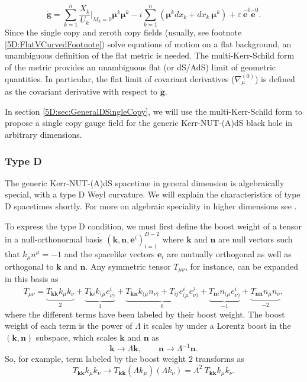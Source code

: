 %
\begin{equation} 
    \mathring{\mathbf{g}} = \sum_{k = 1}^{n} \frac{X_{k}}{U_{k}} \bigg\vert_{M_{k} = 0} \boldsymbol{\mu}^{k}
    \boldsymbol{\mu}^{k} - i \sum_{k = 1}^{n} \left(\boldsymbol{\mu}^{k} dx_{k} + dx_{k}\
    \boldsymbol{\mu}^{k}\right) +
    \varepsilon\ \mathbf{\hat{e}}^{0} \mathbf{\hat{e}}^{0}.
\end{equation}
%
Since the single copy and zeroth copy fields (usually, see footnote \ref{5D:FlatVCurvedFootnote}) solve equations of motion on
a flat background, an unambiguous definition of the flat metric is needed. The multi-Kerr-Schild form of the metric
provides an unambiguous flat (or dS/AdS) limit of geometric quantities. In particular, the flat limit of covariant
derivatives ($ \nabla^{(0)}_{\mu}$) is defined as the covariant derivative with respect to $\mathbf{\mathring{g}}$.


In section \ref{5D:sec:GeneralDSingleCopy}, we will use the multi-Kerr-Schild form to propose a single copy gauge
field for the generic Kerr-NUT-(A)dS black hole in arbitrary dimensions.
\subsubsection{Type D} \label{ssec:5DTypeD}
%
The generic Kerr-NUT-(A)dS spacetime in general dimension is algebraically special, with a type D Weyl curvature.
We will explain the characteristics of type D spacetimes shortly. For more on algebraic speciality
in higher dimensions see \cite{Coley:2004jv, Coley:2007tp, Pravda:2007ty, Ortaggio:2012jd, Milson:2004jx}.

To express the type D condition, we must first define the boost weight of a tensor in a null-orthonormal basis
$(\mathbf{k}, \mathbf{n}, \mathbf{e}^{i})_{i = 1}^{D-2}$ where $\mathbf{k}$ and $\mathbf{n}$ are null vectors such
that $k_{\mu} n^{\mu} = -1$ and the spacelike vectors $\mathbf{e}_{i}$ are mutually orthogonal as well as
orthogonal to $\mathbf{k}$ and $\mathbf{n}$. Any symmetric tensor $T_{\mu \nu}$, for instance, can be expanded in
this basis as
\begin{equation} 
T_{\mu \nu} = \underbrace{T_{\mathbf{kk}} k_{\mu} k_{\nu}}_{2} + \underbrace{T_{\mathbf{k}i} k_{(\mu}
e_{\nu)}^{i}}_{1} + \underbrace{T_{\mathbf{kn}} k_{(\mu}n_{\nu)} + T_{ij} e^{i}_{(\mu} e^{j}_{\nu)}}_{0}
+ \underbrace{T_{\mathbf{n}i} n_{(\mu}
e_{\nu)}^{i}}_{-1} + \underbrace{T_{\mathbf{nn}} n_{\mu} n_{\nu}}_{-2},
\end{equation}
where the different terms have been labeled by their boost weight. The boost weight of each term is the power of
$\Lambda$ it scales by under a Lorentz boost in the $(\mathbf{k}, \mathbf{n})$ subspace, which scales $\mathbf{k}$
and $\mathbf{n}$ as
%
\begin{equation} 
    \mathbf{k} \to \Lambda \mathbf{k}, \qquad \mathbf{n} \to \Lambda^{-1} \mathbf{n}.
\end{equation}
%
So, for example, term labeled by the boost weight $2$ transforms as
%
\begin{equation} 
    T_{\mathbf{kk}} k_{\mu} k_{\nu} \to T_{\mathbf{kk}} (\Lambda k_{\mu}) (\Lambda k_{\nu}) = \Lambda^{2}\ 
    T_{\mathbf{kk}} k_{\mu} k_{\nu}.
\end{equation}

